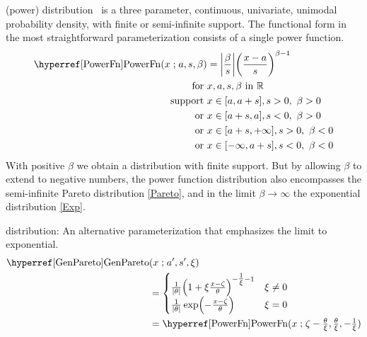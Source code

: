 



\label{sec:PowerFn}


 (power) distribution~\cite{Pearson1916, Meniconi1996,Johnson1995} 
is  a three parameter, continuous, univariate, unimodal probability density, with finite or semi-infinite support. The functional form in the most straightforward  parameterization consists of a single power function.
\begin{align}
\label{PowerFn}
\opr{PowerFn}(x\given a,s,\beta) &= 
\Left|\frac{\beta}{ s}\Right|
\Left(\frac{x-a}{s} \Right)^{\beta -1} \checked
\\
\notag  \text{for } & x, a, s, \beta \text{ in } \mathbb{R}
 \\ \text{ support } & x \in [a,a+s], s>0,\ \beta>0 \notag \checked
  \\ \text{ or } &  x\in[a+s,a], s<0,\ \beta>0  \checked
 \notag 
 \\  \notag  \text{ or } &  x\in[a+s,+\infty], s>0,\ \beta<0 \checked
 \\  \notag  \text{ or } &  x\in[-\infty,a+s], s<0,\ \beta<0 \checked
 \notag
\end{align}
%
With positive $\beta$ we obtain a distribution with finite support. But by allowing $\beta$ to extend to negative numbers, the power function distribution also encompasses the semi-infinite Pareto distribution \eqref{Pareto}, and in the limit $\beta\rightarrow\infty$ the exponential distribution \eqref{Exp}.



 distribution: An alternative parameterization that emphasizes the limit to exponential.
\begin{align}
\label{GenPareto}
\opr{GenPareto}&(x\given a',s',\xi) 
\\ & =
 \begin{cases}
  \frac{1}{|\theta|}\Left( 1 + \xi \frac{x-\pLoc}{\theta}\Right)^{-\tfrac{1}{\xi}-1} & \xi \neq 0 \checked
\notag
\\ 
 \frac{1}{|\theta|} \exp \Left(-\frac{x-\pLoc}{\theta} \Right)& \xi = 0 \checked
\notag
\end{cases}
\\
& = \opr{PowerFn}(x\given \pLoc-\tfrac{\theta}{\xi},\tfrac{\theta}{\xi},  -\tfrac{1}{\xi}) \checked
\notag
\end{align}


